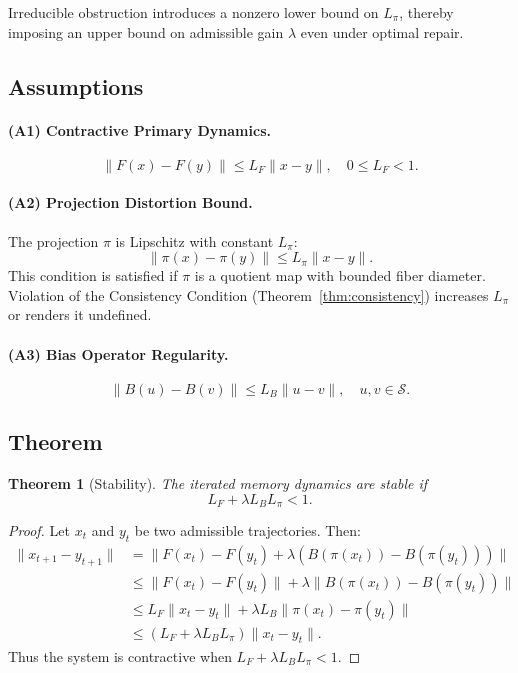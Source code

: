 \documentclass[12pt,a4paper]{article}
\newtheorem{theorem}{Theorem}[section]
\begin{document}
Irreducible obstruction introduces a nonzero lower bound on $L_\pi$, thereby imposing an upper bound on admissible gain $\lambda$ even under optimal repair.

\subsection{Assumptions}

\paragraph{(A1) Contractive Primary Dynamics.}
\[
\|F(x)-F(y)\| \leq L_F \|x-y\|,
\quad 0 \leq L_F < 1.
\]

\paragraph{(A2) Projection Distortion Bound.}
The projection $\pi$ is Lipschitz with constant $L_\pi$:
\[
\|\pi(x) - \pi(y)\| \leq L_\pi \|x-y\|.
\]
This condition is satisfied if $\pi$ is a quotient map with bounded fiber diameter. Violation of the Consistency Condition (Theorem~\ref{thm:consistency}) increases $L_\pi$ or renders it undefined.

\paragraph{(A3) Bias Operator Regularity.}
\[
\|B(u)-B(v)\| \leq L_B \|u-v\|,
\quad u,v \in \mathcal{S}.
\]

\subsection{Theorem}

\begin{theorem}[Stability]
\label{thm:stability}
The iterated memory dynamics are stable if
\[
L_F + \lambda L_B L_\pi < 1.
\]
\end{theorem}

\begin{proof}
Let $x_t$ and $y_t$ be two admissible trajectories. Then:
\begin{align*}
\|x_{t+1} - y_{t+1}\|
&= \|F(x_t)-F(y_t) + \lambda (B(\pi(x_t)) - B(\pi(y_t)))\| \\
&\leq \|F(x_t)-F(y_t)\| + \lambda \|B(\pi(x_t)) - B(\pi(y_t))\| \\
&\leq L_F \|x_t - y_t\| + \lambda L_B \|\pi(x_t) - \pi(y_t)\| \\
&\leq \left(L_F + \lambda L_B L_\pi\right)\|x_t - y_t\|.
\end{align*}
Thus the system is contractive when $L_F + \lambda L_B L_\pi < 1$.
\end{proof}
\end{document}
